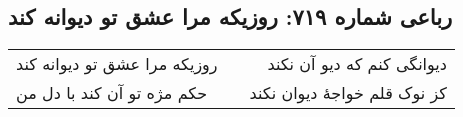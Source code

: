 \begin{center}
\section*{رباعی شماره ۷۱۹: روزیکه مرا عشق تو دیوانه کند}
\label{sec:0719}
\begin{longtable}{l p{0.5cm} r}
روزیکه مرا عشق تو دیوانه کند
&&
دیوانگی کنم که دیو آن نکند
\\
حکم مژه تو آن کند با دل من
&&
کز نوک قلم خواجهٔ دیوان نکند
\\
\end{longtable}
\end{center}

